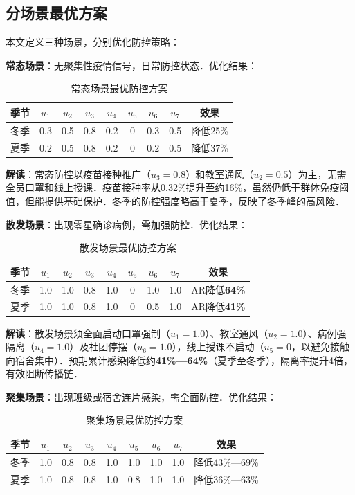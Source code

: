 \subsection{分场景最优方案}

本文定义三种场景，分别优化防控策略：

\textbf{常态场景}：无聚集性疫情信号，日常防控状态．优化结果：

\begin{table}[H]
  \centering
  \caption{常态场景最优防控方案}
  \begin{tabular}{c|ccccccc|c}
    \toprule
    季节 & $u_1$ & $u_2$ & $u_3$ & $u_4$ & $u_5$ & $u_6$ & $u_7$ & 效果 \\
    \midrule
    冬季 & 0.3 & 0.5 & 0.8 & 0.2 & 0 & 0.3 & 0.5 & 降低25\% \\
    夏季 & 0.2 & 0.5 & 0.8 & 0.2 & 0 & 0.2 & 0.5 & 降低37\% \\
    \bottomrule
  \end{tabular}
\end{table}

\textbf{解读}：常态防控以疫苗接种推广（$u_3=0.8$）和教室通风（$u_2=0.5$）为主，无需全员口罩和线上授课．疫苗接种率从0.32\%提升至约16\%，虽然仍低于群体免疫阈值，但能提供基础保护．冬季的防控强度略高于夏季，反映了冬季峰的高风险．

\textbf{散发场景}：出现零星确诊病例，需加强防控．优化结果：

\begin{table}[H]
  \centering
  \caption{散发场景最优防控方案}
  \begin{tabular}{c|ccccccc|c}
    \toprule
    季节 & $u_1$ & $u_2$ & $u_3$ & $u_4$ & $u_5$ & $u_6$ & $u_7$ & 效果 \\
    \midrule
    冬季 & 1.0 & 1.0 & 0.8 & 1.0 & 0 & 1.0 & 1.0 & AR降低\textbf{64\%} \\
    夏季 & 1.0 & 1.0 & 0.8 & 1.0 & 0 & 0.5 & 1.0 & AR降低\textbf{41\%} \\
    \bottomrule
  \end{tabular}
\end{table}

\textbf{解读}：散发场景须全面启动口罩强制（$u_1=1.0$）、教室通风（$u_2=1.0$）、病例强隔离（$u_4=1.0$）及社团停摆（$u_6=1.0$），线上授课不启动（$u_5=0$，以避免接触向宿舍集中）．预期累计感染降低约\textbf{41\%—64\%}（夏季至冬季），隔离率提升4倍，有效阻断传播链．

\textbf{聚集场景}：出现班级或宿舍连片感染，需全面防控．优化结果：

\begin{table}[H]
  \centering
  \caption{聚集场景最优防控方案}
  \begin{tabular}{c|ccccccc|c}
    \toprule
    季节 & $u_1$ & $u_2$ & $u_3$ & $u_4$ & $u_5$ & $u_6$ & $u_7$ & 效果 \\
    \midrule
    冬季 & 1.0 & 0.8 & 0.8 & 1.0 & 1.0 & 1.0 & 1.0 & 降低43\%—69\% \\
    夏季 & 1.0 & 0.8 & 0.8 & 1.0 & 0.8 & 1.0 & 1.0 & 降低36\%—63\% \\
    \bottomrule
  \end{tabular}
\end{table}

